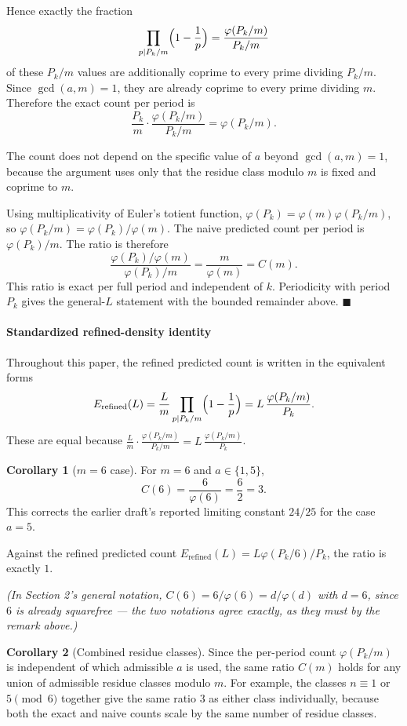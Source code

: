 \documentclass[
]{article}
\begin{document}
Hence exactly the fraction \[
\prod_{p\mid P_k/m}\Bigl(1-\frac1p\Bigr) = \frac{\varphi(P_k/m)}{P_k/m}
\] of these \(P_k/m\) values are additionally coprime to every prime
dividing \(P_k/m\). Since \(\gcd(a,m)=1\), they are already coprime to
every prime dividing \(m\). Therefore the exact count per period is \[
\frac{P_k}{m}\cdot\frac{\varphi(P_k/m)}{P_k/m} = \varphi(P_k/m).
\]

The count does not depend on the specific value of \(a\) beyond
\(\gcd(a,m)=1\), because the argument uses only that the residue class
modulo \(m\) is fixed and coprime to \(m\).

Using multiplicativity of Euler's totient function,
\(\varphi(P_k)=\varphi(m)\varphi(P_k/m)\), so
\(\varphi(P_k/m)=\varphi(P_k)/\varphi(m)\). The naive predicted count
per period is \(\varphi(P_k)/m\). The ratio is therefore \[
\frac{\varphi(P_k)/\varphi(m)}{\varphi(P_k)/m} = \frac{m}{\varphi(m)} = C(m).
\] This ratio is exact per full period and independent of \(k\).
Periodicity with period \(P_k\) gives the general-\(L\) statement with
the bounded remainder above. \(\blacksquare\)

\paragraph{Standardized refined-density
identity}\label{standardized-refined-density-identity}

Throughout this paper, the refined predicted count is written in the
equivalent forms \[
E_{\mathrm{refined}}(L) = \frac{L}{m}\prod_{p\mid P_k/m}\Bigl(1-\frac1p\Bigr) = L\,\frac{\varphi(P_k/m)}{P_k}.
\] These are equal because
\(\frac{L}{m}\cdot\frac{\varphi(P_k/m)}{P_k/m} = L\,\frac{\varphi(P_k/m)}{P_k}\).

\textbf{Corollary 1} (\(m=6\) case). For \(m=6\) and \(a\in\{1,5\}\), \[
C(6) = \frac{6}{\varphi(6)} = \frac62 = 3.
\] This corrects the earlier draft's reported limiting constant
\(24/25\) for the case \(a=5\).

Against the refined predicted count
\(E_{\mathrm{refined}}(L)=L\varphi(P_k/6)/P_k\), the ratio is exactly
\(1\).

\emph{(In Section 2's general notation,
\(C(6)=6/\varphi(6)=d/\varphi(d)\) with \(d=6\), since \(6\) is already
squarefree --- the two notations agree exactly, as they must by the
remark above.)}

\textbf{Corollary 2} (Combined residue classes). Since the per-period
count \(\varphi(P_k/m)\) is independent of which admissible \(a\) is
used, the same ratio \(C(m)\) holds for any union of admissible residue
classes modulo \(m\). For example, the classes \(n\equiv1\) or
\(5\pmod6\) together give the same ratio \(3\) as either class
individually, because both the exact and naive counts scale by the same
number of residue classes.
\end{document}
